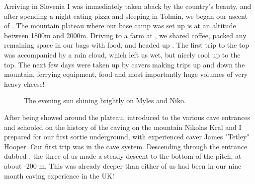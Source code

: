 Arriving in Slovenia I was immediately taken aback by the country's beauty, and after spending
a night eating pizza and sleeping in \passage[town]Tolmin, we began our ascent of . The mountain plateau
where our base camp was set up is at an altitude between 1800m and 2000m. Driving to a farm at
, we shared coffee, packed any remaining space in our bags with food, and headed up .
The first trip to the top was accompanied by a rain cloud, which left us wet, but nicely cool up to the
top. The next few days were taken up by cavers making trips up and down the mountain, ferrying
equipment, food and most importantly huge volumes of very heavy cheese!


\begin{figure}[t!]
\checkoddpage \ifoddpage \forcerectofloat \else \forceversofloat \fi
{}
\caption{The evening sun shining brightly on Myles and Niko. }
\end{figure}





After being showed around the plateau, introduced to the various cave entrances and schooled on
the history of the caving on the mountain Nikolas Kral and I prepared for our first sortie underground,
with experienced caver James "Tetley" Hooper. Our first trip was in the  cave system.
Descending through the entrance dubbed , the three of us made a steady descent to
the bottom of the  pitch, at about -200 m. This was already deeper than either of us had been
in our nine month caving experience in the UK!


